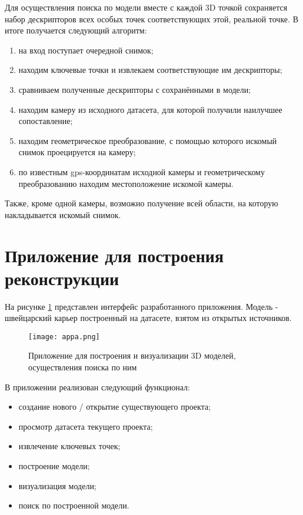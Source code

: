 Для осуществления поиска по модели вместе с каждой 3D точкой сохраняется набор дескрипторов всех особых точек соответствующих этой, реальной точке. В итоге получается следующий алгоритм:

\begin{enumerate}
    \item на вход поступает очередной снимок;
    \item находим ключевые точки и извлекаем соответствующие им дескрипторы;
    \item сравниваем полученные дескрипторы с сохранёнными в модели;
    \item находим камеру из исходного датасета, для которой получили наилучшее сопоставление;
    \item находим геометрическое преобразование, с помощью которого искомый снимок проецируется на  камеру;
    \item по известным gps-координатам исходной камеры и геометрическому преобразованию находим местоположение искомой камеры.
\end{enumerate}

Также, кроме одной камеры, возможно получение всей области, на которую накладывается искомый снимок.

\section{Приложение для построения реконструкции}

На рисунке \ref{fig:appa} представлен интерфейс разработанного приложения. Модель - швейцарский карьер построенный на датасете, взятом из открытых источников.

\begin{figure}[h]
    \centering
    \texttt{[image: appa.png]}
    \caption{Приложение для построения и визуализации 3D моделей, осуществления поиска по ним}
    \label{fig:appa}
\end{figure}

В приложении реализован следующий функционал:

\begin{itemize}
    \item создание нового / открытие существующего проекта;
    \item просмотр датасета текущего проекта;
    \item извлечение ключевых точек;
    \item построение модели;
    \item визуализация модели;
    \item поиск по построенной модели.
\end{itemize}


